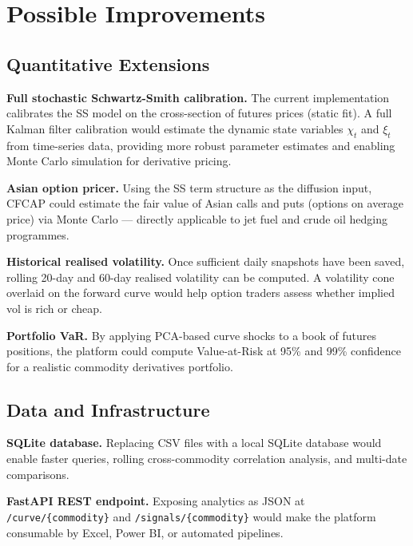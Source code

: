 \documentclass[11pt,a4paper]{article}
\begin{document}
\section{Possible Improvements}

\subsection{Quantitative Extensions}

\textbf{Full stochastic Schwartz-Smith calibration.}
The current implementation calibrates the SS model on the cross-section of futures prices (static fit). A full Kalman filter calibration would estimate the dynamic state variables $\chi_t$ and $\xi_t$ from time-series data, providing more robust parameter estimates and enabling Monte Carlo simulation for derivative pricing.

\textbf{Asian option pricer.}
Using the SS term structure as the diffusion input, CFCAP could estimate the fair value of Asian calls and puts (options on average price) via Monte Carlo --- directly applicable to jet fuel and crude oil hedging programmes.

\textbf{Historical realised volatility.}
Once sufficient daily snapshots have been saved, rolling 20-day and 60-day realised volatility can be computed. A volatility cone overlaid on the forward curve would help option traders assess whether implied vol is rich or cheap.

\textbf{Portfolio VaR.}
By applying PCA-based curve shocks to a book of futures positions, the platform could compute Value-at-Risk at 95\% and 99\% confidence for a realistic commodity derivatives portfolio.

\subsection{Data and Infrastructure}

\textbf{SQLite database.}
Replacing CSV files with a local SQLite database would enable faster queries, rolling cross-commodity correlation analysis, and multi-date comparisons.

\textbf{FastAPI REST endpoint.}
Exposing analytics as JSON at \texttt{/curve/\{commodity\}} and \texttt{/signals/\{commodity\}} would make the platform consumable by Excel, Power BI, or automated pipelines.
\end{document}
